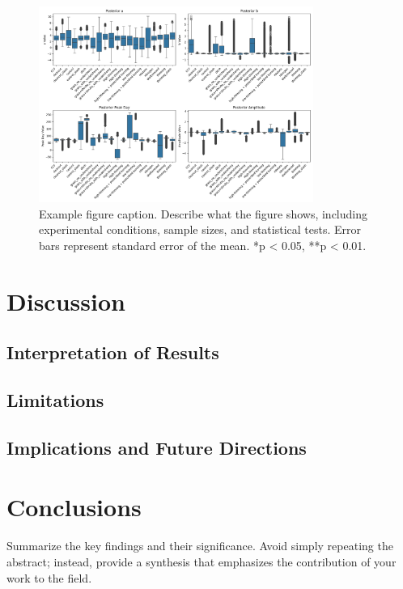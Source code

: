 \documentclass[12pt,a4paper]{article}
\begin{document}
\begin{figure}[H]
    \centering
    \includegraphics[width=0.8\textwidth]{"../other_params.png"}
    \caption{Example figure caption. Describe what the figure shows, including experimental conditions, sample sizes, and statistical tests. Error bars represent standard error of the mean. *p < 0.05, **p < 0.01.}
    \label{fig:example}
\end{figure}



\section{Discussion}

\subsection{Interpretation of Results}


\subsection{Limitations}

\subsection{Implications and Future Directions}



\section{Conclusions}

Summarize the key findings and their significance. Avoid simply repeating the abstract; instead, provide a synthesis that emphasizes the contribution of your work to the field.
\end{document}
